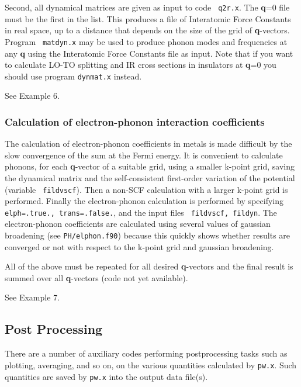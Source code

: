 \documentclass[12pt]{article}
\begin{document}
Second, all dynamical matrices are given as input to code {\tt
q2r.x}. The {\bf q}=0 file must be the first in the list. This produces
a file of Interatomic Force Constants in real space, up to a distance
that depends on the size of the grid of {\bf q}-vectors. Program {\tt
matdyn.x} may be used to produce phonon modes and frequencies at any
{\bf q} using the Interatomic Force Constants file as input. Note that
if you want to calculate LO-TO splitting and IR cross sections in
insulators at {\bf q}=0 you should use program {\tt dynmat.x} instead.

See Example 6.

\subsubsection{Calculation of electron-phonon interaction coefficients}

The calculation of electron-phonon coefficients in metals is made
difficult by the slow convergence of the sum at the Fermi energy. It is
convenient to calculate phonons, for each {\bf q}-vector of a suitable
grid, using a smaller k-point grid, saving the dynamical matrix and the
self-consistent first-order variation of the potential (variable {\tt
fildvscf}). Then a non-SCF calculation with a larger k-point grid is
performed.  Finally the electron-phonon calculation is performed by
specifying {\tt elph=.true., trans=.false.}, and the input files {\tt
fildvscf, fildyn}. The electron-phonon coefficients are calculated using
several values of gaussian broadening (see {\tt PH/elphon.f90}) because
this quickly shows whether results are converged or not with respect to
the k-point grid and gaussian broadening.

All of the above must be repeated for all desired {\bf q}-vectors and
the final result is summed over all {\bf q}-vectors (code not yet
available).

See Example 7.

\subsection{Post Processing}

There are a number of auxiliary codes performing postprocessing tasks
such as plotting, averaging, and so on, on the various quantities
calculated by {\tt pw.x}. Such quantities are saved by {\tt pw.x} into
the output data file(s).
\end{document}
